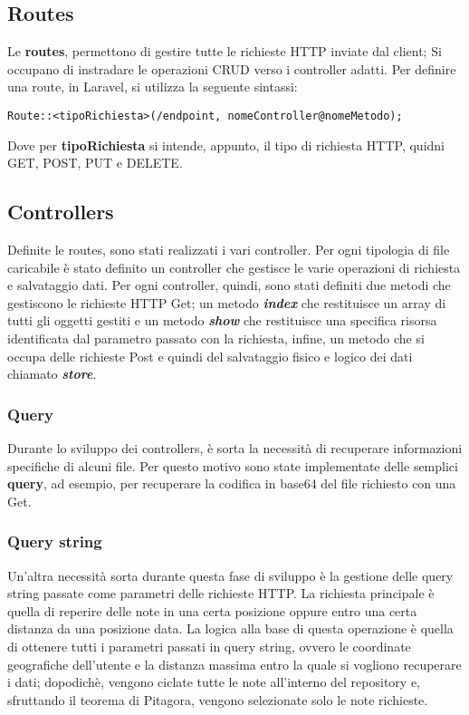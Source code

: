 \subsection{Routes}

Le \textbf{routes}, permettono di gestire tutte le richieste HTTP inviate dal client; Si occupano di instradare le operazioni CRUD verso i controller adatti. Per definire una route, in Laravel, si utilizza la seguente sintassi: 
\begin{lstlisting}
Route::<tipoRichiesta>(/endpoint, nomeController@nomeMetodo);
\end{lstlisting}
Dove per \textbf{tipoRichiesta} si intende, appunto, il tipo di richiesta HTTP, quidni GET, POST, PUT e DELETE.
 
\subsection{Controllers}
Definite le routes, sono stati realizzati i vari controller. Per ogni tipologia di file caricabile è stato definito un controller che gestisce le varie operazioni di richiesta e salvataggio dati.
Per ogni controller, quindi, sono stati definiti due metodi che gestiscono le richieste HTTP Get; un metodo \textit{\textbf{index}} che restituisce un array di tutti gli oggetti gestiti e un metodo \textit{\textbf{show}} che restituisce una specifica risorsa identificata dal parametro passato con la richiesta, infine, un metodo che si occupa delle richieste Post e quindi del salvataggio fisico e logico dei dati chiamato \textit{\textbf{store}}.
 
\subsubsection{Query}
Durante lo sviluppo dei controllers, è sorta la necessità di recuperare informazioni specifiche di alcuni file.
Per questo motivo sono state implementate delle semplici \textbf{query}, ad esempio, per recuperare la codifica in base64 del file richiesto con una Get.

\subsubsection{Query string}
Un'altra necessità sorta durante questa fase di sviluppo è la gestione delle query string passate come parametri delle richieste HTTP.
La richiesta principale è quella di reperire delle note in una certa posizione oppure entro una certa distanza da una posizione data.
La logica alla base di questa operazione è quella di ottenere tutti i parametri passati in query string, ovvero le coordinate geografiche dell'utente e la distanza massima entro la quale si vogliono recuperare i dati; dopodichè, vengono ciclate tutte le note all'interno del repository e, sfruttando il teorema di Pitagora, vengono selezionate solo le note richieste.

